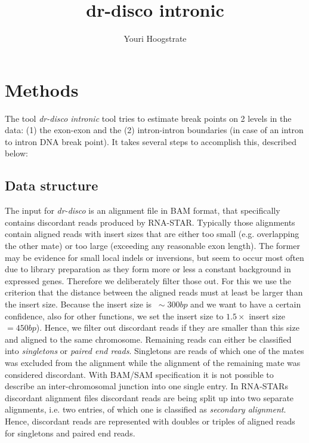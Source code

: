 \documentclass{article}
\title{dr-disco intronic}
\author[1]{Youri Hoogstrate}
\affil[1]{Department of Urology, Department of Bioinformatics, Erasmus University Medical Center}
\theoremstyle{definition}
\begin{document}
\maketitle



\doublespace

\section{Methods}
The tool \textit{dr-disco intronic} tool tries to estimate break points on 2 levels in the data: (1) the exon-exon and the (2) intron-intron boundaries (in case of an intron to intron DNA break point).
It takes several steps to accomplish this, described below:

\subsection{Data structure}
The input for \textit{dr-disco} is an alignment file in BAM format, that specifically contains discordant reads produced by RNA-STAR.
Typically those alignments contain aligned reads with insert sizes that are either too small (e.g. overlapping the other mate) or too large (exceeding any reasonable exon length).
The former may be evidence for small local indels or inversions, but seem to occur most often due to library preparation as they form more or less a constant background in expressed genes.
Therefore we deliberately filter those out.
For this we use the criterion that the distance between the aligned reads must at least be larger than the insert size. Because the insert size is $~\sim 300bp$ and we want to have a certain confidence, also for other functions, we set the insert size to $1.5 \times$ insert size$=450bp$). Hence, we filter out discordant reads if they are smaller than this size and aligned to the same chromosome.
Remaining reads can either be classified into \textit{singletons} or \textit{paired end reads}.
Singletons are reads of which one of the mates was excluded from the alignment while the alignment of the remaining mate was considered discordant.
With BAM/SAM specification it is not possible to describe an inter-chromosomal junction into one single entry.
In RNA-STARs discordant alignment files discordant reads are being split up into two separate alignments, i.e. two entries, of which one is classified as \textit{secondary alignment}.
Hence, discordant reads are represented with doubles or triples of aligned reads for singletons and paired end reads.
\end{document}

